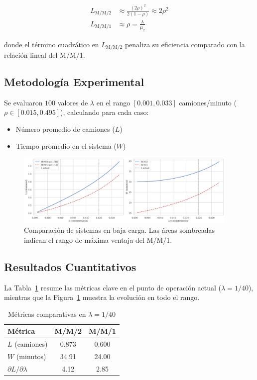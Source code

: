 \documentclass[12pt, a4paper]{article}
\begin{document}
    \begin{align}
    	L_{\text{M/M/2}} &\approx \frac{(2\rho)^2}{2(1-\rho)} \approx 2\rho^2 \\
    	L_{\text{M/M/1}} &\approx \rho = \frac{\lambda}{\mu_2}
    \end{align}
    
    donde el término cuadrático en $L_{\text{M/M/2}}$ penaliza su eficiencia comparado con la relación lineal del M/M/1.
    
    \subsection{Metodología Experimental}
    Se evaluaron $100$ valores de $\lambda$ en el rango $[0.001, 0.033]$ camiones/minuto ($\rho \in [0.015, 0.495]$), calculando para cada caso:
    \begin{itemize}
    	\item Número promedio de camiones ($L$)
    	\item Tiempo promedio en el sistema ($W$)
    \end{itemize}
    
    \begin{figure}[H]
    	\centering
    	\includegraphics[width=0.95\textwidth]{figures/hipotesis1_resultados.png}
    	\caption{Comparación de sistemas en baja carga. Las áreas sombreadas indican el rango de máxima ventaja del M/M/1.}
    	\label{fig:hip1-results}
    \end{figure}
    
    \subsection{Resultados Cuantitativos}
    La Tabla~\ref{tab:hip1-metrics} resume las métricas clave en el punto de operación actual ($\lambda = 1/40$), mientras que la Figura~\ref{fig:hip1-results} muestra la evolución en todo el rango.
    
    \begin{table}[H]
    	\centering
    	\caption{Métricas comparativas en $\lambda = 1/40$}
    	\label{tab:hip1-metrics}
    	\begin{tabular}{lcc}
    		\toprule
    		\textbf{Métrica} & \textbf{M/M/2} & \textbf{M/M/1} \\
    		\midrule
    		$L$ (camiones) & 0.873 & 0.600 \\
    		$W$ (minutos) & 34.91 & 24.00 \\
    		$\partial L/\partial \lambda$ & 4.12 & 2.85 \\
    		\bottomrule
    	\end{tabular}
    \end{table}
    
\end{document}
